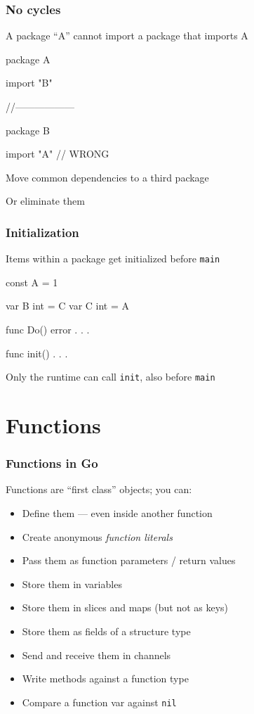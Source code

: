 \documentclass[handout,compress,t,11pt]{beamer}
\begin{document}
\begin{frame}[fragile]
\frametitle{No cycles}
A package ``A'' cannot import a package that imports A
\begin{golang}
package A

import "B"

//------------------

package B

import "A"    // WRONG
\end{golang}
\vspace{1.5\baselineskip}
Move common dependencies to a third package \par
\vspace{0.5\baselineskip}
Or eliminate them \par
\end{frame}

\begin{frame}[fragile]
\frametitle{Initialization}
Items within a package get initialized before \verb|main|
\begin{golang}
const A = 1

var B int = C
var C int = A

func Do() error {
    . . .
}

func init() {
    . . .
}
\end{golang}
\vspace{\baselineskip}
Only the runtime can call \verb|init|, also before \verb|main|
\end{frame}


\section{Functions}
\begin{frame}[fragile]
    \frametitle{Functions in Go}
    Functions are ``first class'' objects; you can:
    \begin{itemize}
        \item Define them --- even inside another function
        \item Create anonymous {\em function literals}
        \item Pass them as function parameters / return values
        \item Store them in variables
        \item Store them in slices and maps (but not as keys)
        \item Store them as fields of a structure type
        \item Send and receive them in channels
        \item Write methods against a function type
        \item Compare a function var against \verb|nil|
    \end{itemize}
\end{frame}
\end{document}
